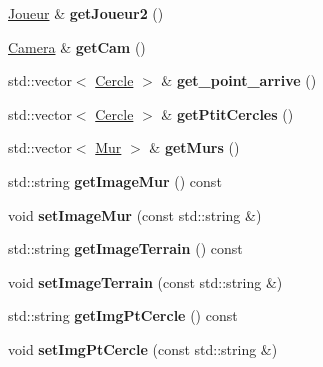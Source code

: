 \begin{DoxyCompactItemize}
\item 
\mbox{\label{class_jeu_aee1a811aa9dfc6e5dc8535e7d3c276ba}} 
\mbox{\hyperlink{class_joueur}{Joueur}} \& {\bfseries get\+Joueur2} ()
\item 
\mbox{\label{class_jeu_ad8f08faad5346cc9b6667432df49bb54}} 
\mbox{\hyperlink{class_camera}{Camera}} \& {\bfseries get\+Cam} ()
\item 
\mbox{\label{class_jeu_afe9e8b7f988d23eeaca9ef54823e2535}} 
std\+::vector$<$ \mbox{\hyperlink{class_cercle}{Cercle}} $>$ \& {\bfseries get\+\_\+point\+\_\+arrive} ()
\item 
\mbox{\label{class_jeu_ac8090c73233d155239fa18701447ab88}} 
std\+::vector$<$ \mbox{\hyperlink{class_cercle}{Cercle}} $>$ \& {\bfseries get\+Ptit\+Cercles} ()
\item 
\mbox{\label{class_jeu_aa6c6c3e14b56f212381aa48955c006e1}} 
std\+::vector$<$ \mbox{\hyperlink{class_mur}{Mur}} $>$ \& {\bfseries get\+Murs} ()
\item 
\mbox{\label{class_jeu_a580054f7d393f990cd7a423849f049e1}} 
std\+::string {\bfseries get\+Image\+Mur} () const
\item 
\mbox{\label{class_jeu_aa5fea3241653279273019e0546252ca1}} 
void {\bfseries set\+Image\+Mur} (const std\+::string \&)
\item 
\mbox{\label{class_jeu_a2d7a95e03f82279231a55b4b628b94c9}} 
std\+::string {\bfseries get\+Image\+Terrain} () const
\item 
\mbox{\label{class_jeu_a6e15898fd91fd822f6d645129f507377}} 
void {\bfseries set\+Image\+Terrain} (const std\+::string \&)
\item 
\mbox{\label{class_jeu_af3e0cea8fe88a18b84350cbda0a99706}} 
std\+::string {\bfseries get\+Img\+Pt\+Cercle} () const
\item 
\mbox{\label{class_jeu_a430b9c16c774aeee8a1b62078c129802}} 
void {\bfseries set\+Img\+Pt\+Cercle} (const std\+::string \&)
\item 

\end{DoxyCompactItemize}
